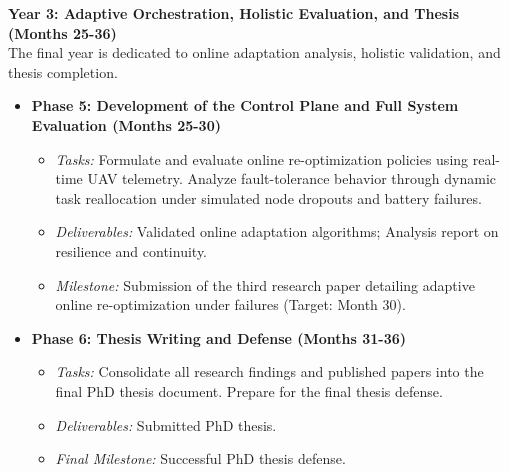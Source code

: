 \textbf{Year 3: Adaptive Orchestration, Holistic Evaluation, and Thesis (Months 25-36)} \\
The final year is dedicated to online adaptation analysis, holistic validation, and thesis completion.
\begin{itemize}
  \item \textbf{Phase 5: Development of the Control Plane and Full System Evaluation (Months 25-30)}
    \begin{itemize}
      \item \textit{Tasks:} Formulate and evaluate online re-optimization policies using real-time UAV telemetry. Analyze fault-tolerance behavior through dynamic task reallocation under simulated node dropouts and battery failures.
      \item \textit{Deliverables:} Validated online adaptation algorithms; Analysis report on resilience and continuity.
      \item \textit{Milestone:} Submission of the third research paper detailing adaptive online re-optimization under failures (Target: Month 30).
    \end{itemize}
  \item \textbf{Phase 6: Thesis Writing and Defense (Months 31-36)}
    \begin{itemize}
      \item \textit{Tasks:} Consolidate all research findings and published papers into the final PhD thesis document. Prepare for the final thesis defense.
      \item \textit{Deliverables:} Submitted PhD thesis.
      \item \textit{Final Milestone:} Successful PhD thesis defense.
    \end{itemize}
\end{itemize}
